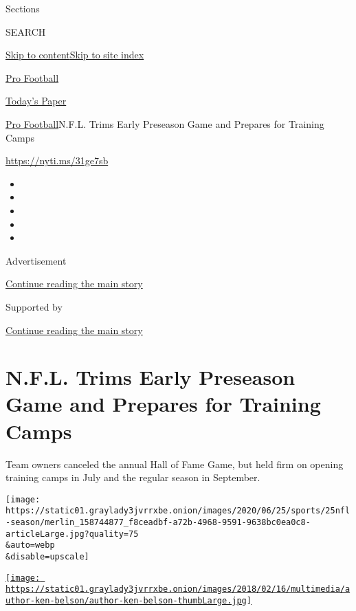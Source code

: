 Sections

SEARCH

\protect\hyperlink{site-content}{Skip to
content}\protect\hyperlink{site-index}{Skip to site index}

\href{https://www.nytimes3xbfgragh.onion/section/sports/football}{Pro
Football}

\href{https://myaccount.nytimes3xbfgragh.onion/auth/login?response_type=cookie\&client_id=vi}{}

\href{https://www.nytimes3xbfgragh.onion/section/todayspaper}{Today's
Paper}

\href{/section/sports/football}{Pro Football}\textbar{}N.F.L. Trims
Early Preseason Game and Prepares for Training Camps

\url{https://nyti.ms/31ge7sb}

\begin{itemize}
\item
\item
\item
\item
\item
\end{itemize}

Advertisement

\protect\hyperlink{after-top}{Continue reading the main story}

Supported by

\protect\hyperlink{after-sponsor}{Continue reading the main story}

\hypertarget{nfl-trims-early-preseason-game-and-prepares-for-training-camps}{%
\section{N.F.L. Trims Early Preseason Game and Prepares for Training
Camps}\label{nfl-trims-early-preseason-game-and-prepares-for-training-camps}}

Team owners canceled the annual Hall of Fame Game, but held firm on
opening training camps in July and the regular season in September.

\texttt{[image: https://static01.graylady3jvrrxbe.onion/images/2020/06/25/sports/25nfl-season/merlin\_158744877\_f8ceadbf-a72b-4968-9591-9638bc0ea0c8-articleLarge.jpg?quality=75\\\&auto=webp\\\&disable=upscale]}

\href{https://www.nytimes3xbfgragh.onion/by/ken-belson}{\texttt{[image: https://static01.graylady3jvrrxbe.onion/images/2018/02/16/multimedia/author-ken-belson/author-ken-belson-thumbLarge.jpg]}}

